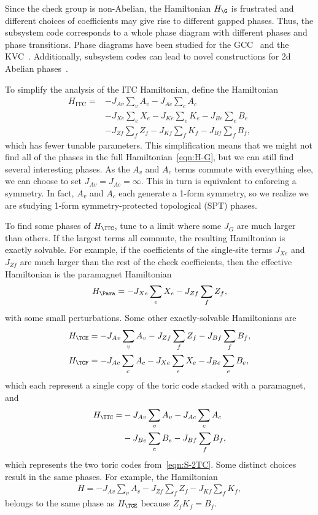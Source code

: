 Since the check group is non-Abelian, the Hamiltonian $H_\G$ is frustrated and different choices of coefficients may give rise to different gapped phases. Thus, the subsystem code corresponds to a whole phase diagram with different phases and phase transitions. Phase diagrams have been studied for the GCC~\cite{Kubica2018Ungauging} and the KVC~\cite{Li2023PhaseDiagram}. Additionally, subsystem codes can lead to novel constructions for 2d Abelian phases~\cite{Ellison2022Subsystem}.

To simplify the analysis of the ITC Hamiltonian, define the Hamiltonian
\begin{align}
H_\text{ITC} = &- J_{Av} \sum_v A_v - J_{Ac} \sum_c A_c \nonumber\\
& - J_{Xe} \sum_e X_e - J_{Ke} \sum_e K_e - J_{Be} \sum_e B_e \nonumber\\
& - J_{Zf} \sum_f Z_f - J_{Kf} \sum_f K_f - J_{Bf} \sum_f B_f,
\end{align}
which has fewer tunable parameters. This simplification means that we might not find all of the phases in the full Hamiltonian~\eqref{eqn:H-G}, but we can still find several interesting phases. As the $A_v$ and $A_c$ terms commute with everything else, we can choose to set $J_{Av}=J_{Ac}=\infty$. This in turn is equivalent to enforcing a symmetry. In fact, $A_v$ and $A_c$ each generate a 1-form symmetry, so we realize we are studying 1-form symmetry-protected topological (SPT) phases. 

To find some phases of $H_\ITC$, tune to a limit where some $J_G$ are much larger than others. If the largest terms all commute, the resulting Hamiltonian is exactly solvable. For example, if the coefficients of the single-site terms $J_{Xe}$ and $J_{Zf}$ are much larger than the rest of the check coefficients, then the effective Hamiltonian is the paramagnet Hamiltonian
\begin{align}
H_\Para = - J_{Xe} \sum_e X_e - J_{Zf} \sum_f Z_f, \label{eqn:H-para}
\end{align}
with some small perturbations. Some other exactly-solvable Hamiltonians are
\begin{align}
H_{\TCE} &= - J_{Av} \sum_v A_v - J_{Zf} \sum_f Z_f - J_{Bf} \sum_f B_f, \label{eqn:H-TCE}\\ 
H_{\TCF} &= - J_{Ac} \sum_c A_c - J_{Xe} \sum_e X_e - J_{Be} \sum_e B_e, \label{eqn:H-TCF}
\end{align}
which each represent a single copy of the toric code stacked with a paramagnet, and
\begin{align}
H_\TTC =& - J_{Av} \sum_v A_v - J_{Ac} \sum_c A_c \nonumber\\
&- J_{Be} \sum_e B_e - J_{Bf} \sum_f B_f, \label{eqn:H-2TC}
\end{align}
which represents the two toric codes from~\eqref{eqn:S-2TC}. Some distinct choices result in the same phases. For example, the Hamiltonian
\begin{align}
H = - J_{Av} \sum_v A_v - J_{Zf} \sum_f Z_f - J_{Kf} \sum_f K_f,
\end{align}
belongs to the same phase as $H_\TCE$ because $Z_fK_f = B_f$. 

